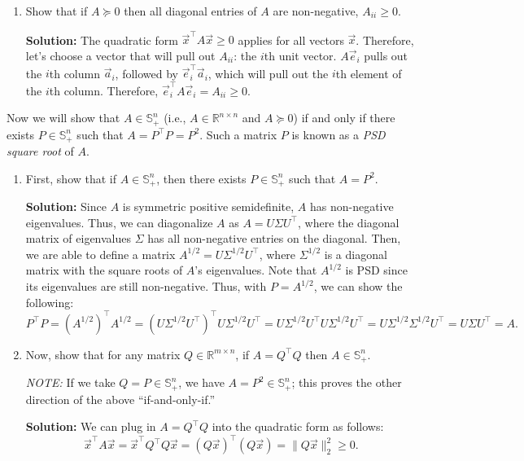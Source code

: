\documentclass[10pt]{article}
\theoremstyle{definition}
\theoremstyle{plain}
\newcommand{\RR}{\mathbb{R}}
\begin{document}
\begin{enumerate}[label=(\alph*)]
    \item Show that if $A \succeq 0$ then all diagonal entries of $A$ are non-negative, $A_{ii} \ge 0$.

    \textbf{Solution:} The quadratic form $\vec{x}^\top A \vec{x} \ge 0$ applies for all vectors $\vec{x}$. Therefore, let's choose a vector that will pull out $A_{ii}$: the $i$th unit vector. $A\vec{e}_i$ pulls out the $i$th column $\vec{a}_i$, followed by $\vec{e}_i^\top \vec{a}_i$, which will pull out the $i$th element of the $i$th column. Therefore, $\vec{e}_i^\top A \vec{e}_i = A_{ii} \ge 0$.
\end{enumerate}

Now we will show that $A \in \mathbb{S}^n_+$ (i.e., $A \in \RR^{n \times n}$ and $A \succeq 0$) if and only if there exists $P \in \mathbb{S}^n_+$ such that $A = P^\top P = P^2$. Such a matrix $P$ is known as a \emph{PSD square root} of $A$.

\begin{enumerate}[label=(\alph*), resume]
    \item First, show that if $A \in \mathbb{S}^n_+$, then there exists $P \in \mathbb{S}^n_+$ such that $A = P^2$.

    \textbf{Solution:} Since $A$ is symmetric positive semidefinite, $A$ has non-negative eigenvalues. Thus, we can diagonalize $A$ as $A = U\Sigma U^\top$, where the diagonal matrix of eigenvalues $\Sigma$ has all non-negative entries on the diagonal. Then, we are able to define a matrix $A^{1/2} = U\Sigma^{1/2}U^\top$, where $\Sigma^{1/2}$ is a diagonal matrix with the square roots of $A$'s eigenvalues. Note that $A^{1/2}$ is PSD since its eigenvalues are still non-negative. Thus, with $P = A^{1/2}$, we can show the following:
    \begin{equation}
        P^\top P = (A^{1/2})^\top A^{1/2} = (U\Sigma^{1/2}U^\top)^\top U\Sigma^{1/2}U^\top = U\Sigma^{1/2}U^\top U\Sigma^{1/2}U^\top = U\Sigma^{1/2}\Sigma^{1/2}U^\top = U\Sigma U^\top = A.
    \end{equation}

    \item Now, show that for any matrix $Q \in \RR^{m \times n}$, if $A = Q^\top Q$ then $A \in \mathbb{S}^n_+$.

    \emph{NOTE:} If we take $Q = P \in \mathbb{S}^n_+$, we have $A = P^2 \in \mathbb{S}^n_+$; this proves the other direction of the above ``if-and-only-if.''

    \textbf{Solution:} We can plug in $A = Q^\top Q$ into the quadratic form as follows:
    \begin{equation}
        \vec{x}^\top A \vec{x} = \vec{x}^\top Q^\top Q \vec{x} = (Q\vec{x})^\top (Q\vec{x}) = \|Q\vec{x}\|_2^2 \ge 0.
    \end{equation}
\end{enumerate}
\end{document}
